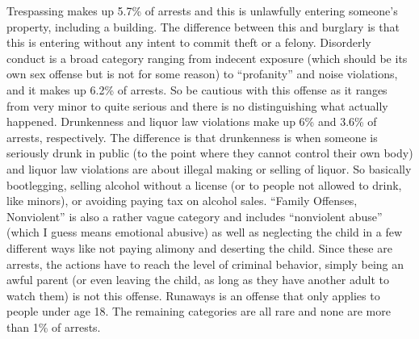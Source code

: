 \documentclass[
]{krantz}
\begin{document}
Trespassing makes up 5.7\% of arrests and this is unlawfully
entering someone's property, including a building. The
difference between this and burglary is that this is
entering without any intent to commit theft or a felony.
Disorderly conduct is a broad category ranging from indecent
exposure (which should be its own sex offense but is not for
some reason) to ``profanity'' and noise violations, and it
makes up 6.2\% of arrests. So be cautious with this offense
as it ranges from very minor to quite serious and there is
no distinguishing what actually happened. Drunkenness and
liquor law violations make up 6\% and 3.6\% of arrests,
respectively. The difference is that drunkenness is when
someone is seriously drunk in public (to the point where
they cannot control their own body) and liquor law
violations are about illegal making or selling of liquor. So
basically bootlegging, selling alcohol without a license (or
to people not allowed to drink, like minors), or avoiding
paying tax on alcohol sales. ``Family Offenses, Nonviolent''
is also a rather vague category and includes ``nonviolent
abuse'' (which I guess means emotional abusive) as well as
neglecting the child in a few different ways like not paying
alimony and deserting the child. Since these are arrests,
the actions have to reach the level of criminal behavior,
simply being an awful parent (or even leaving the child, as
long as they have another adult to watch them) is not this
offense. Runaways is an offense that only applies to people
under age 18. The remaining categories are all rare and none
are more than 1\% of arrests.
\end{document}
